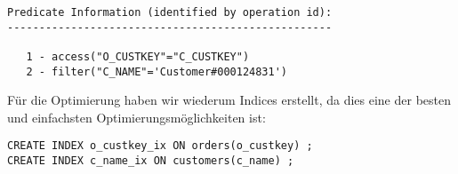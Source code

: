 \documentclass[11pt,a4paper,parskip=half]{scrartcl}
\begin{document}
\begin{lstlisting}
Predicate Information (identified by operation id):                                                                                                                                                                                                                                                          
---------------------------------------------------                                                                                                                                                                                                                                                          
                                                                                                                                                                                                                                                                                                             
   1 - access("O_CUSTKEY"="C_CUSTKEY")                                                                                                                                                                                                                                                                       
   2 - filter("C_NAME"='Customer#000124831')                                                                                                                                                                                                                                                                 
\end{lstlisting}

Für die Optimierung haben wir wiederum Indices erstellt, da dies eine der besten und einfachsten Optimierungsmöglichkeiten ist:
\begin{lstlisting}
CREATE INDEX o_custkey_ix ON orders(o_custkey) ;
CREATE INDEX c_name_ix ON customers(c_name) ;
\end{lstlisting}
\end{document}
